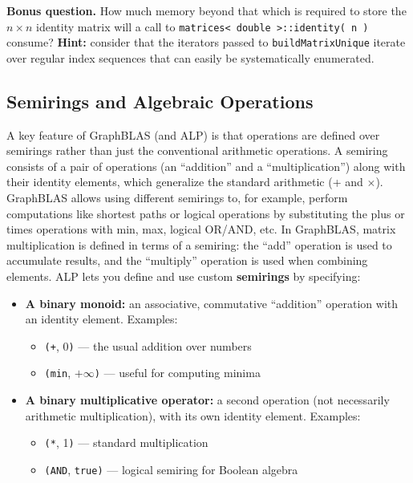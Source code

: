 \noindent \textbf{Bonus question.} How much memory beyond that which is required to store the $n\times n$ identity matrix will a call to \texttt{matrices< double >::identity( n )} consume? \textbf{Hint:} consider that the iterators passed to \texttt{buildMatrixUnique} iterate over regular index sequences that can easily be systematically enumerated.

\subsection{Semirings and Algebraic Operations}

A key feature of GraphBLAS (and ALP) is that operations are defined over semirings rather than just the conventional arithmetic operations. A semiring consists of a pair of operations (an “addition” and a “multiplication”) along with their identity elements, which generalize the standard arithmetic (+ and $\times$). GraphBLAS allows using different semirings to, for example, perform computations like shortest paths or logical operations by substituting the plus or times operations with min, max, logical OR/AND, etc. In GraphBLAS, matrix multiplication is defined in terms of a semiring: the “add” operation is used to accumulate results, and the “multiply” operation is used when combining elements.
ALP lets you define and use custom \textbf{semirings} by specifying:


\begin{itemize}
  \item \textbf{A binary monoid:} an associative, commutative ``addition'' operation with an identity element. Examples:
  \begin{itemize}
    \item \texttt{(+}, 0\texttt{)} — the usual addition over numbers
    \item \texttt{(min}, $+\infty$\texttt{)} — useful for computing minima
  \end{itemize}
  
  \item \textbf{A binary multiplicative operator:} a second operation (not necessarily arithmetic multiplication), with its own identity element. Examples:
  \begin{itemize}
    \item \texttt{(*}, 1\texttt{)} — standard multiplication
    \item \texttt{(AND}, \texttt{true}\texttt{)} — logical semiring for Boolean algebra
  \end{itemize}
\end{itemize}

